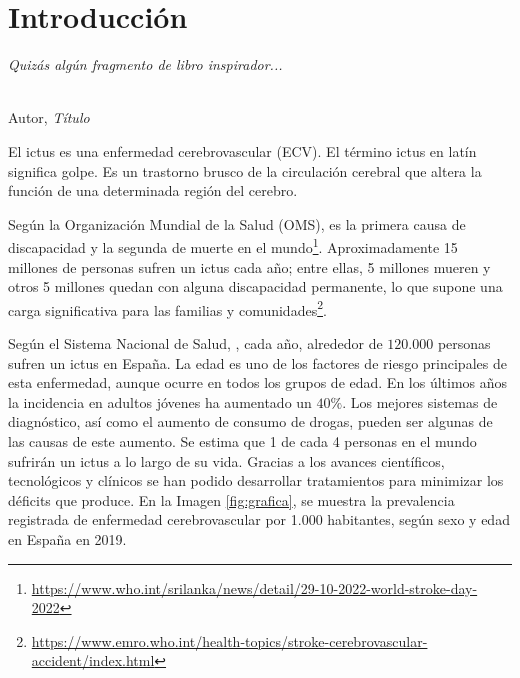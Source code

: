 \chapter{Introducción}
\label{cap:capitulo1}
\setcounter{page}{1}

\begin{flushright}
\begin{minipage}[]{10cm}
\emph{Quizás algún fragmento de libro inspirador...}\\
\end{minipage}\\

Autor, \textit{Título}\\
\end{flushright}

\vspace{1cm}

El ictus es una enfermedad cerebrovascular (ECV).
El término ictus en latín significa golpe.
Es un trastorno brusco de la circulación cerebral que altera la función de una determinada región del cerebro.

Según la Organización Mundial de la Salud (OMS), es la primera causa de discapacidad y la segunda de muerte en el mundo\footnote{\url{https://www.who.int/srilanka/news/detail/29-10-2022-world-stroke-day-2022}}.
Aproximadamente 15 millones de personas sufren un ictus cada año; entre ellas, 5 millones mueren y otros 5 millones quedan con alguna discapacidad permanente, lo que supone una carga significativa para las familias y comunidades\footnote{\url{https://www.emro.who.int/health-topics/stroke-cerebrovascular-accident/index.html}}.

Según el Sistema Nacional de Salud, \cite{perales1a}, cada año, alrededor de $120.000$ personas sufren un ictus en España.
La edad es uno de los factores de riesgo principales de esta enfermedad, aunque ocurre en todos los grupos de edad.
En los últimos años la incidencia en adultos jóvenes ha aumentado un $40\%$.
Los mejores sistemas de diagnóstico, así como el aumento de consumo de drogas, pueden ser algunas de las causas de este aumento.
Se estima que 1 de cada 4 personas en el mundo sufrirán un ictus a lo largo de su vida.
Gracias a los avances científicos, tecnológicos y clínicos se han podido desarrollar tratamientos para minimizar los déficits que produce.
En la Imagen \ref{fig:grafica}, se muestra la prevalencia registrada de enfermedad cerebrovascular por 1.000 habitantes, según sexo y edad en España en 2019.\\


